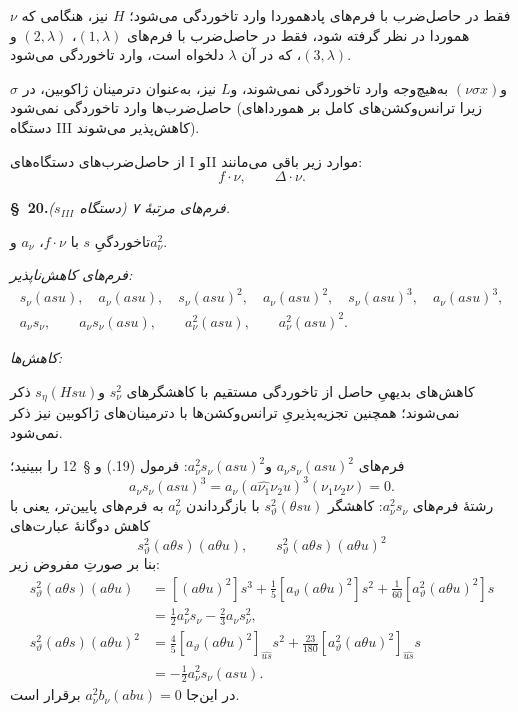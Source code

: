 \documentclass[11pt]{article}
\begin{document}
$\nu$ فقط در حاصل‌ضرب با فرم‌های پادهموردا وارد تاخوردگی می‌شود؛ $H$ نیز، هنگامی که هموردا در نظر گرفته شود، فقط در حاصل‌ضرب با فرم‌های $(1,\lambda)$، $(2,\lambda)$ و$(3,\lambda)$، که در آن $\lambda$ دلخواه است، وارد تاخوردگی می‌شود.

$\sigma$ و$(\nu\sigma x)$ به‌هیچ‌وجه وارد تاخوردگی نمی‌شوند، و$L$ نیز، به‌عنوان دترمینان ژاکوبین، در حاصل‌ضرب‌ها وارد تاخوردگی نمی‌شود (زیرا ترانس‌وکشن‌های کامل بر همورداهای دستگاه III کاهش‌پذیر می‌شوند).

از حاصل‌ضرب‌های دستگاه‌های I وII موارد زیر باقی می‌مانند:
\[
f\cdot \nu,\qquad \Delta\cdot \nu.
\]

\begin{center}
\textbf{\S\ 20.}\quad\emph{فرم‌های مرتبهٔ ۷ (دستگاه $s_{III}$).}
\end{center}

تاخوردگیِ $s$ با $f\cdot \nu$، $a_\nu$ و$a_\nu^2$.

\noindent\emph{فرم‌های کاهش‌ناپذیر:}
\[
\begin{gathered}
s_\nu(asu),\quad a_\nu(asu),\quad s_\nu(asu)^2,\quad a_\nu(asu)^2,\quad
s_\nu(asu)^3,\quad a_\nu(asu)^3,\\
a_\nu s_\nu,\qquad a_\nu s_\nu(asu),\qquad a_\nu^2(asu),\qquad a_\nu^2(asu)^2.
\end{gathered}
\]

\noindent\emph{کاهش‌ها:}

کاهش‌های بدیهیِ حاصل از تاخوردگی مستقیم با کاهشگرهای $s_\nu^2$ و$s_\eta(Hsu)$ ذکر نمی‌شوند؛ همچنین تجزیه‌پذیریِ ترانس‌وکشن‌ها با دترمینان‌های ژاکوبین نیز ذکر نمی‌شود.

فرم‌های $a_\nu s_\nu(asu)^2$ و$a_\nu^2s_\nu(asu)^2$: فرمول (19.) و \S\ 12 را ببینید؛
\[
a_\nu s_\nu(asu)^3=a_\nu(a\widehat{\nu_1}\nu_2u)^3(\nu_1\nu_2\nu)=0.
\]
رشتهٔ فرم‌های $a_\nu^2s_\nu$: کاهشگر $s_\vartheta^2(\theta su)$ با بازگرداندن $a_\nu^2$ به فرم‌های پایین‌تر، یعنی با کاهش دوگانهٔ عبارت‌های
\[
s_\vartheta^2(a\theta s)(a\theta u),\qquad
s_\vartheta^2(a\theta s)(a\theta u)^2
\]
بنا بر صورتِ مفروض زیر:
\[
\begin{aligned}
s_\vartheta^2(a\theta s)(a\theta u)
&=[(a\theta u)^2]s^3+\frac15[a_\vartheta(a\theta u)^2]s^2+\frac1{60}[a_\vartheta^2(a\theta u)^2]s\\
&=\frac12a_\nu^2s_\nu-\frac23a_\nu s_\nu^2,\\
s_\vartheta^2(a\theta s)(a\theta u)^2
&=\frac45[a_\vartheta(a\theta u)^2]_{\widehat{us}}s^2+\frac{23}{180}[a_\vartheta^2(a\theta u)^2]_{\widehat{us}}s\\
&=-\frac12a_\nu^2s_\nu(asu).
\end{aligned}
\]
در این‌جا $a_\nu^2b_\nu(abu)=0$ برقرار است.
\end{document}
